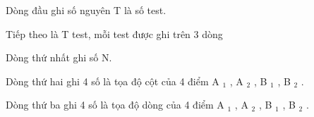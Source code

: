 Dòng đầu ghi số nguyên T là số test.

Tiếp theo là T test, mỗi test được ghi trên 3 dòng

Dòng thứ nhất ghi số N.

Dòng thứ hai ghi 4 số là tọa độ cột của 4 điểm A $_ 1 $ , A $_ 2 $ , B $_ 1 $ , B $_ 2 $ .

Dòng thứ ba ghi 4 số là tọa độ dòng của 4 điểm A $_ 1 $ , A $_ 2 $ , B $_ 1 $ , B $_ 2 $ .